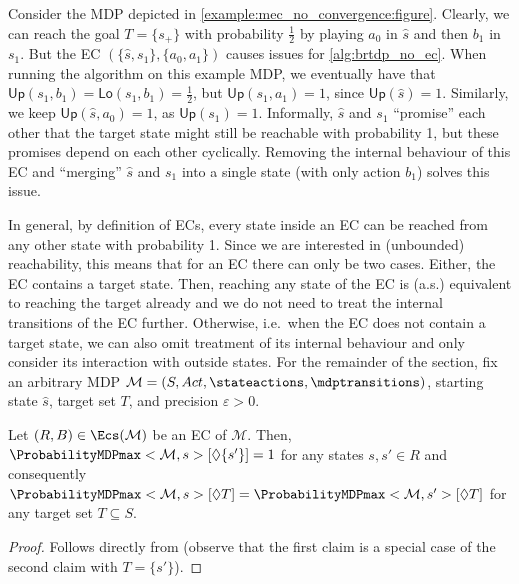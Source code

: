 \documentclass{theoretics}
\newcommand{\MDP}{\mathcal{M}}
\newcommand{\States}{S}
\newcommand{\initialstate}{\hat{s}}
\newcommand{\Actions}{Act}
\newcommand{\reach}{\Diamond}
\newcommand{\upperbound}{\mathsf{Up}}
\newcommand{\lowerbound}{\mathsf{Lo}}
\newcommand{\targetstate}{s_+}
\newcommand{\targetset}{T}
\begin{document}
\begin{example} \label{example:mec_no_convergence}
	Consider the MDP depicted in \cref{example:mec_no_convergence:figure}.
	Clearly, we can reach the goal $\targetset = \{\targetstate\}$ with probability $\frac{1}{2}$ by playing $a_0$ in $\initialstate$ and then $b_1$ in $s_1$.
	But the EC $(\{\initialstate, s_1\}, \{a_0, a_1\})$ causes issues for \cref{alg:brtdp_no_ec}.
	When running the algorithm on this example MDP, we eventually have that $\upperbound(s_1, b_1) = \lowerbound(s_1, b_1) = \frac{1}{2}$, but $\upperbound(s_1, a_1) = 1$, since $\upperbound(\initialstate) = 1$.
	Similarly, we keep $\upperbound(\initialstate, a_0) = 1$, as $\upperbound(s_1) = 1$.
	Informally, $\initialstate$ and $s_1$ \enquote{promise} each other that the target state might still be reachable with probability 1, but these promises depend on each other cyclically.
	Removing the internal behaviour of this EC and \enquote{merging} $\initialstate$ and $s_1$ into a single state (with only action $b_1$) solves this issue.
\end{example}
In general, by definition of ECs, every state inside an EC can be reached from any other state with probability 1.
Since we are interested in (unbounded) reachability, this means that for an EC there can only be two cases.
Either, the EC contains a target state.
Then, reaching any state of the EC is (a.s.) equivalent to reaching the target already and we do not need to treat the internal transitions of the EC further.
Otherwise, i.e.\ when the EC does not contain a target state, we can also omit treatment of its internal behaviour and only consider its interaction with outside states.
For the remainder of the section, fix an arbitrary MDP $\MDP = (\States, \Actions, \stateactions, \mdptransitions)$, starting state $\initialstate$, target set $\targetset$, and precision $\varepsilon > 0$.
\begin{lemma} \label{stm:ec_same_value}
	Let $(R, B) \in \Ecs(\MDP)$ be an EC of $\MDP$.
	Then, $\ProbabilityMDPmax<\MDP,s>[\reach \{s'\}] = 1$ for any states $s, s' \in R$ and consequently $\ProbabilityMDPmax<\MDP,s>[\reach \targetset] = \ProbabilityMDPmax<\MDP,s'>[\reach \targetset]$ for any target set $\targetset \subseteq \States$.
\end{lemma}

\begin{proof}
	Follows directly from \cite[Lemma~1]{DBLP:conf/qest/CiesinskiBGK08} (observe that the first claim is a special case of the second claim with $\targetset = \{s'\}$). 
\end{proof}
\end{document}
